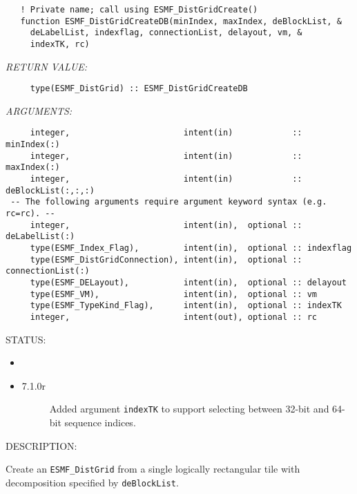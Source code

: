  
\begin{verbatim}   ! Private name; call using ESMF_DistGridCreate()
   function ESMF_DistGridCreateDB(minIndex, maxIndex, deBlockList, &
     deLabelList, indexflag, connectionList, delayout, vm, &
     indexTK, rc)
           \end{verbatim}{\em RETURN VALUE:}
\begin{verbatim}     type(ESMF_DistGrid) :: ESMF_DistGridCreateDB\end{verbatim}{\em ARGUMENTS:}
\begin{verbatim}     integer,                       intent(in)            :: minIndex(:)
     integer,                       intent(in)            :: maxIndex(:)
     integer,                       intent(in)            :: deBlockList(:,:,:)
 -- The following arguments require argument keyword syntax (e.g. rc=rc). --
     integer,                       intent(in),  optional :: deLabelList(:)
     type(ESMF_Index_Flag),         intent(in),  optional :: indexflag
     type(ESMF_DistGridConnection), intent(in),  optional :: connectionList(:)
     type(ESMF_DELayout),           intent(in),  optional :: delayout
     type(ESMF_VM),                 intent(in),  optional :: vm
     type(ESMF_TypeKind_Flag),      intent(in),  optional :: indexTK
     integer,                       intent(out), optional :: rc\end{verbatim}
{\sf STATUS:}
   \begin{itemize}
   \item{}
   \item{}
   \begin{description}
   \item[7.1.0r] Added argument {\tt indexTK} to support selecting between
                 32-bit and 64-bit sequence indices.
   \end{description}
   \end{itemize}
  
{\sf DESCRIPTION:\\ }


       \begin{sloppypar}
       Create an {\tt ESMF\_DistGrid} from a single logically rectangular 
       tile with decomposition specified by {\tt deBlockList}.
       \end{sloppypar}
  

